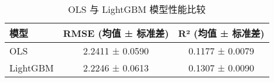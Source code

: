 \begin{table}[htbp]
\centering
\caption{OLS 与 LightGBM 模型性能比较}
\label{tab:model_comparison}
\begin{tabular}{lcc}
\toprule
\textbf{模型} & \textbf{RMSE (均值 ± 标准差)} & \textbf{R² (均值 ± 标准差)} \\
\midrule
OLS & 2.2411 ± 0.0590 & 0.1177 ± 0.0079 \\
LightGBM & 2.2246 ± 0.0613 & 0.1307 ± 0.0090 \\
\bottomrule
\end{tabular}
\end{table}
